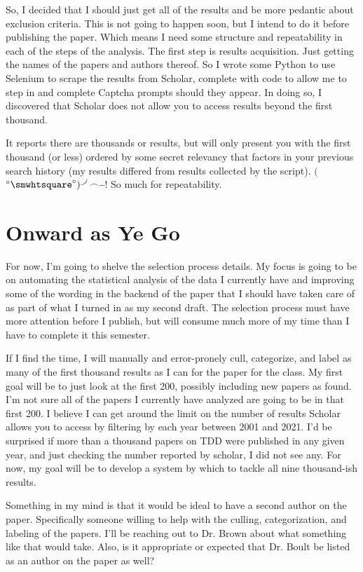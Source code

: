 \documentclass[8pt, letterpaper]{article}
\newcommand{\kora}{$($\rotatebox{45}{$\smile$}$^{\circ}\smwhtsquare^{\circ})\rotatebox{45}{$\smile$}\mkern-6mu\frown$\raisebox{0.5ex}{$\bot$}$\mkern-3.5mu-\mkern-3.5mu$\raisebox{0.5ex}{$\bot$}}
\begin{document}
So, I decided that I should just get all of the results and be more pedantic about exclusion criteria.
This is not going to happen soon, but I intend to do it before publishing the paper.
Which means I need some structure and repeatability in each of the steps of the analysis.
The first step is results acquisition.
Just getting the names of the papers and authors thereof.
So I wrote some Python to use Selenium\cite{Angmo_seleniumtool} to scrape the results from Scholar, complete with code to allow me to step in and complete Captcha prompts should they appear.
In doing so, I discovered that Scholar does not allow you to access results beyond the first thousand.

It reports there are thousands or results, but will only present you with the first thousand (or less) ordered by some secret relevancy that factors in your previous search history (my results differed from results collected by the script).
\kora!
So much for repeatability.

\section{Onward as Ye Go}

For now, I'm going to shelve the selection process details.
My focus is going to be on automating the statistical analysis of the data I currently have and improving some of the wording in the backend of the paper that I should have taken care of as part of what I turned in as my second draft.
The selection process must have more attention before I publish, but will consume much more of my time than I have to complete it this semester.

If I find the time, I will manually and error-pronely cull, categorize, and label as many of the first thousand results as I can for the paper for the class.
My first goal will be to just look at the first 200, possibly including new papers as found.
I'm not sure all of the papers I currently have analyzed are going to be in that first 200.
I believe I can get around the limit on the number of results Scholar allows you to access by filtering by each year between 2001 and 2021.
I'd be surprised if more than a thousand papers on TDD were published in any given year, and just checking the number reported by scholar, I did not see any.
For now, my goal will be to develop a system by which to tackle all nine thousand-ish results.

Something in my mind is that it would be ideal to have a second author on the paper.
Specifically someone willing to help with the culling, categorization, and labeling of the papers.
I'll be reaching out to Dr. Brown about what something like that would take.
Also, is it appropriate or expected that Dr. Boult be listed as an author on the paper as well?




\end{document}
